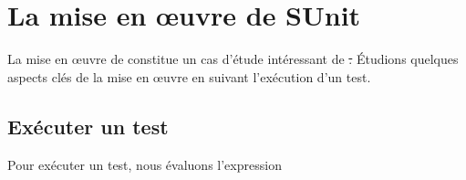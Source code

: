 \documentclass[a4paper,10pt,twoside]{book}
\begin{document}
\section{La mise en \oe uvre de SUnit}

La mise en \oe uvre de \sunit constitue un cas d'étude intéressant de  \st.
\'Etudions quelques aspects clés de la mise en \oe uvre en suivant l'exécution d'un test.
\subsection{Exécuter un test}

Pour exécuter un test, nous évaluons l'expression 
\end{document}

